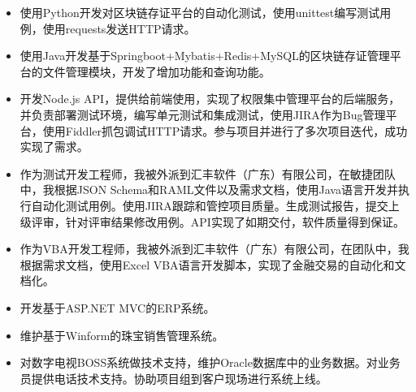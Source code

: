 \documentclass{resume}
\begin{document}
\begin{itemize}[parsep=0.5ex]
  \item 使用Python开发对区块链存证平台的自动化测试，使用unittest编写测试用例，使用requests发送HTTP请求。
  \item 使用Java开发基于Springboot+Mybatis+Redis+MySQL的区块链存证管理平台的文件管理模块，开发了增加功能和查询功能。
  \item 开发Node.js API，提供给前端使用，实现了权限集中管理平台的后端服务，并负责部署测试环境，编写单元测试和集成测试，使用JIRA作为Bug管理平台，使用Fiddler抓包调试HTTP请求。参与项目并进行了多次项目迭代，成功实现了需求。
\end{itemize}

\begin{itemize}[parsep=0.5ex]
  \item 作为测试开发工程师，我被外派到汇丰软件（广东）有限公司，在敏捷团队中，我根据JSON Schema和RAML文件以及需求文档，使用Java语言开发并执行自动化测试用例。使用JIRA跟踪和管控项目质量。生成测试报告，提交上级评审，针对评审结果修改用例。API实现了如期交付，软件质量得到保证。
\end{itemize}

\begin{itemize}[parsep=0.5ex]
  \item 作为VBA开发工程师，我被外派到汇丰软件（广东）有限公司，在团队中，我根据需求文档，使用Excel VBA语言开发脚本，实现了金融交易的自动化和文档化。
\end{itemize}

\begin{itemize}[parsep=0.5ex]
  \item 开发基于ASP.NET MVC的ERP系统。
  \item 维护基于Winform的珠宝销售管理系统。
\end{itemize}

\begin{itemize}[parsep=0.5ex]
  \item 对数字电视BOSS系统做技术支持，维护Oracle数据库中的业务数据。对业务员提供电话技术支持。协助项目组到客户现场进行系统上线。
\end{itemize}
\end{document}
